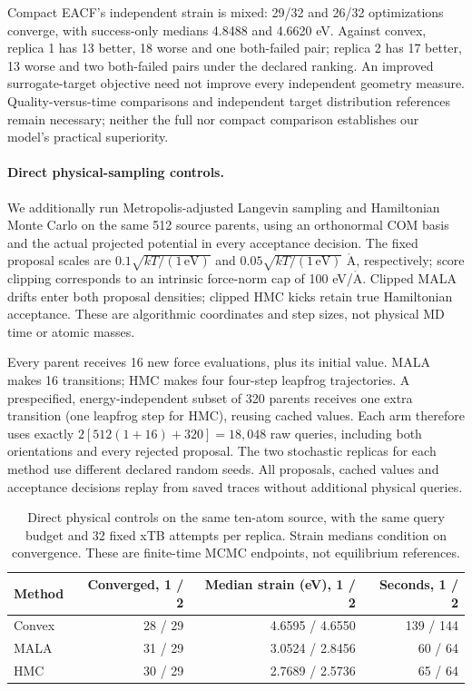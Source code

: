 Compact EACF's independent strain is mixed: 29/32 and 26/32 optimizations
converge, with success-only medians 4.8488 and 4.6620 eV. Against convex,
replica 1 has 13 better, 18 worse and one both-failed pair; replica 2 has
17 better, 13 worse and two both-failed pairs under the declared ranking.
An improved surrogate-target objective need not improve every independent
geometry measure. Quality-versus-time comparisons and independent target
distribution references remain necessary; neither the full nor compact
comparison establishes our model's practical superiority.

\paragraph{Direct physical-sampling controls.}
We additionally run Metropolis-adjusted Langevin sampling
\citep{roberts1996langevin} and Hamiltonian Monte Carlo
\citep{neal2012hmc} on the same 512 source parents, using an orthonormal COM
basis and the actual projected potential in every acceptance decision.
The fixed proposal scales are $0.1\sqrt{kT/(1\,\mathrm{eV})}$ and
$0.05\sqrt{kT/(1\,\mathrm{eV})}$ $\mathrm{\mathring A}$, respectively;
score clipping corresponds to an intrinsic force-norm cap of
100 eV/$\mathrm{\mathring A}$. Clipped MALA drifts enter both proposal
densities; clipped HMC kicks retain true Hamiltonian acceptance. These are
algorithmic coordinates and step sizes, not physical MD time or atomic masses.

Every parent receives 16 new force evaluations, plus its initial value.
MALA makes 16 transitions; HMC makes four four-step leapfrog trajectories.
A prespecified, energy-independent subset of 320 parents receives one extra
transition (one leapfrog step for HMC), reusing cached values. Each arm therefore
uses exactly $2[512(1+16)+320]=18{,}048$ raw queries, including both orientations
and every rejected proposal. The two stochastic replicas for each method use
different declared random seeds. All proposals, cached values and acceptance
decisions replay from saved traces without additional physical queries.

\begin{table}[t]
\centering
\caption{Direct physical controls on the same ten-atom source, with the same
query budget and 32 fixed xTB attempts per replica. Strain medians condition on
convergence. These are finite-time MCMC endpoints, not equilibrium references.}
\label{tab:physical-controls}
\begin{tabular}{lrrr}
\toprule
Method & Converged, 1 / 2 & Median strain (eV), 1 / 2 & Seconds, 1 / 2\\
\midrule
Convex & 28 / 29 & 4.6595 / 4.6550 & 139 / 144\\
MALA & 31 / 29 & 3.0524 / 2.8456 & 60 / 64\\
HMC & 30 / 29 & 2.7689 / 2.5736 & 65 / 64\\
\bottomrule
\end{tabular}
\end{table}


